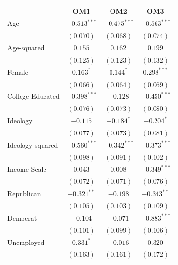 \documentclass[11pt,]{article}
\begin{document}
\begin{table}
\begin{center}
\begin{tabular}{l c c c }
\hline
 & \textbf{OM1} & \textbf{OM2} & \textbf{OM3} \\
\hline
Age                         & $-0.513^{***}$ & $-0.475^{***}$ & $-0.563^{***}$ \\
                            & $(0.070)$      & $(0.068)$      & $(0.074)$      \\
Age-squared                 & $0.155$        & $0.162$        & $0.199$        \\
                            & $(0.125)$      & $(0.123)$      & $(0.132)$      \\
Female                      & $0.163^{*}$    & $0.144^{*}$    & $0.298^{***}$  \\
                            & $(0.066)$      & $(0.064)$      & $(0.069)$      \\
College Educated            & $-0.398^{***}$ & $-0.128$       & $-0.450^{***}$ \\
                            & $(0.076)$      & $(0.073)$      & $(0.080)$      \\
Ideology                    & $-0.115$       & $-0.184^{*}$   & $-0.204^{*}$   \\
                            & $(0.077)$      & $(0.073)$      & $(0.081)$      \\
Ideology-squared            & $-0.560^{***}$ & $-0.342^{***}$ & $-0.373^{***}$ \\
                            & $(0.098)$      & $(0.091)$      & $(0.102)$      \\
Income Scale                & $0.043$        & $0.008$        & $-0.349^{***}$ \\
                            & $(0.072)$      & $(0.071)$      & $(0.076)$      \\
Republican                  & $-0.321^{**}$  & $-0.198$       & $-0.343^{**}$  \\
                            & $(0.105)$      & $(0.103)$      & $(0.109)$      \\
Democrat                    & $-0.104$       & $-0.071$       & $-0.883^{***}$ \\
                            & $(0.101)$      & $(0.099)$      & $(0.106)$      \\
Unemployed                  & $0.331^{*}$    & $-0.016$       & $0.320$        \\
                            & $(0.163)$      & $(0.161)$      & $(0.172)$      \\

\end{tabular}
\end{center}
\end{table}
\end{document}
